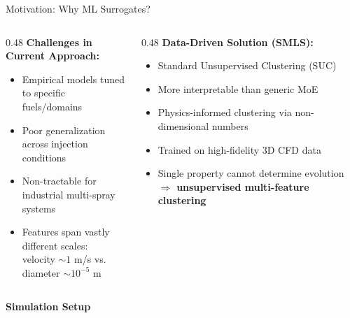 \documentclass[aspectratio=169]{beamer}
\begin{document}
\begin{frame}{Motivation: Why ML Surrogates?}
\begin{columns}[T]
\begin{column}{0.48\textwidth}
\textbf{\color{smls_red}Challenges in Current Approach:}
\begin{itemize}[<+->]
    \item Empirical models tuned to specific fuels/domains
    \item Poor generalization across injection conditions
    \item Non-tractable for industrial multi-spray systems
    \item Features span vastly different scales:\\
    velocity $\sim 1$ m/s vs. diameter $\sim 10^{-5}$ m
\end{itemize}
\end{column}
\begin{column}{0.48\textwidth}
\pause
\textbf{\color{smls_green}Data-Driven Solution (SMLS):}
\begin{itemize}[<+->]
    \item Standard Unsupervised Clustering (SUC)
    \item More interpretable than generic MoE
    \item Physics-informed clustering via non-dimensional numbers
    \item Trained on high-fidelity 3D CFD data
    \item Single property cannot determine evolution $\Rightarrow$ \textbf{unsupervised multi-feature clustering}
\end{itemize}
\end{column}
\end{columns}
\end{frame}

\begin{frame}{}
\vfill
\begin{center}
{\Huge\textbf{Simulation Setup}}
\end{center}
\vfill
\end{frame}
\end{document}
